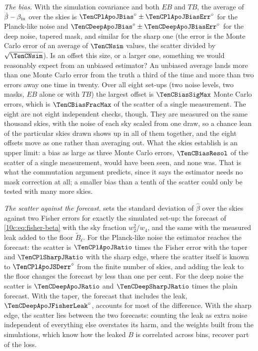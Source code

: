 \emph{The bias.} With the simulation covariance and both $EB$ and $TB$, the average of $\hat\beta-\beta_{\rm in}$ over the
skies is ${\TenCPlApoJBias}^\circ\pm{\TenCPlApoJBiasErr}^\circ$ for the Planck-like noise and ${\TenCDeepApoJBias}^\circ\pm{\TenCDeepApoJBiasErr}^\circ$
for the deep noise, tapered mask, and similar for the sharp one (the error is the Monte Carlo error of an average of
$\TenCNsim$ values, the scatter divided by $\sqrt{\TenCNsim}$). Is an offset this size, or a larger one, something we
would reasonably expect from an unbiased estimator? An unbiased average lands more than one Monte Carlo error
from the truth a third of the time and more than two errors away one time in twenty. Over all eight set-ups (two
noise levels, two masks, $EB$ alone or with $TB$) the largest offset is $\TenCBiasSigMax$ Monte Carlo errors, which is
$\TenCBiasFracMax$ of the scatter of a single measurement. The eight are not eight independent checks, though.
They are measured on the same thousand skies, with the noise of each sky scaled from one draw, so a chance lean of
the particular skies drawn shows up in all of them together, and the eight offsets move as one rather than
averaging out. What the skies establish is an upper limit: a bias as large as three Monte Carlo errors, $\TenCBiasResol$ of the scatter of a
single measurement, would have been seen, and none was. That is what the commutation argument predicts, since it
says the estimator needs no mask correction at all; a smaller bias than a tenth of the scatter could only be
tested with many more skies.

\emph{The scatter against the forecast.}  sets the standard deviation of $\hat\beta$ over the skies
against two Fisher errors for exactly the simulated set-up: the forecast of \eqref{10c:eq:fisher-beta} with the sky
fraction $w_2^2/w_4$, and the same with the measured leak added to the floor $\tilde B_\ell$. For the Planck-like noise
the estimator reaches the forecast: the scatter is $\TenCPlApoJRatio$ times the Fisher error with the taper and
$\TenCPlSharpJRatio$ with the sharp edge, where the scatter itself is known to ${\TenCPlApoJSDerr}^\circ$ from the finite number of skies, and adding the leak to the
floor changes the forecast by less than one per cent. For the deep noise the scatter is $\TenCDeepApoJRatio$ and
$\TenCDeepSharpJRatio$ times the plain forecast. With the taper, the forecast that includes the leak,
${\TenCDeepApoJFisherLeak}^\circ$, accounts for most of the difference. With the sharp edge, the scatter lies between the two
forecasts: counting the leak as extra noise independent of everything else overstates its harm, and the weights
built from the simulations, which know how the leaked $B$ is correlated across bins, recover part of the loss.

